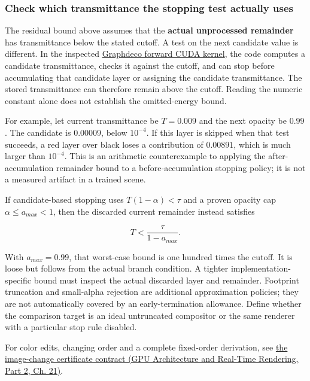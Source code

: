 \subsubsection{Check which transmittance the stopping test actually uses}\label{04-visual-computing-ii-ch041-check-which-transmittance-the-stopping-test-actually-uses}

\hypertarget{04-visual-computing-ii-ch041-check-which-transmittance-the-stopping-test-actually-uses}{}

The residual bound above assumes that the \textbf{actual unprocessed remainder} has transmittance below the stated cutoff. A test on the next candidate value is different. In the inspected \href{https://github.com/graphdeco-inria/diff-gaussian-rasterization/blob/main/cuda_rasterizer/forward.cu}{Graphdeco forward CUDA kernel}, the code computes a candidate transmittance, checks it against the cutoff, and can stop before accumulating that candidate layer or assigning the candidate transmittance. The stored transmittance can therefore remain above the cutoff. Reading the numeric constant alone does not establish the omitted-energy bound.

For example, let current transmittance be \(T=0.009\) and the next opacity be \(0.99\). The candidate is \(0.00009\), below \(10^{-4}\). If this layer is skipped when that test succeeds, a red layer over black loses a contribution of \(0.00891\), which is much larger than \(10^{-4}\). This is an arithmetic counterexample to applying the after-accumulation remainder bound to a before-accumulation stopping policy; it is not a measured artifact in a trained scene.

If candidate-based stopping uses \(T(1-\alpha)<\tau\) and a proven opacity cap \(\alpha\le a_{max}<1\), then the discarded current remainder instead satisfies

\[
T<\frac{\tau}{1-a_{max}}.
\]

With \(a_{max}=0.99\), that worst-case bound is one hundred times the cutoff. It is loose but follows from the actual branch condition. A tighter implementation-specific bound must inspect the actual discarded layer and remainder. Footprint truncation and small-alpha rejection are additional approximation policies; they are not automatically covered by an early-termination allowance. Define whether the comparison target is an ideal untruncated compositor or the same renderer with a particular stop rule disabled.

For color edits, changing order and a complete fixed-order derivation, see \href{../06-GPU-Architecture-and-Real-Time-Rendering-P02/main.pdf\#nameddest=06-engine-ii-ch045-an-image-change-certificate-must-name-the-edits-it-covers}{the image-change certificate contract (GPU Architecture and Real-Time Rendering, Part 2, Ch. 21)}.

